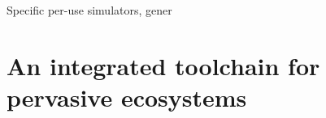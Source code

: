 \documentclass[12pt,a4paper,twoside,openright]{book}
\begin{document}
Specific per-use simulators, gener


\part{An integrated toolchain for pervasive ecosystems}

%
\end{document}
